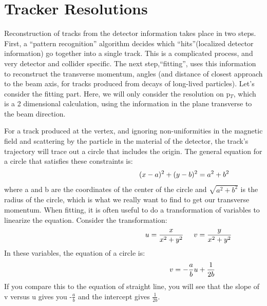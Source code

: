 \section{Tracker Resolutions}
Reconstruction of tracks from the detector information takes place in two steps. First, a ``pattern recognition'' algorithm decides which ``hits''(localized detector information) go together into a single track. This is a complicated process, and very detector and collider specific. The next step,``fitting'', uses this information to reconstruct the transverse momentum, angles (and distance of closest approach to the beam axis, for tracks produced from decays of long-lived particles).  
Let's consider the fitting part.  Here, we will only consider the resolution on p$_{T}$, which is a 2 dimensional calculation, using the information in the plane transverse to the beam direction.   

For a track produced at the vertex, and ignoring non-uniformities in the magnetic field and scattering by the particle in the material of the detector, the track's trajectory will trace out a circle that includes the origin.  The general equation for a circle that satisfies these constraints is:
\begin{equation*}\hspace{50 mm}
(x-a)^{2}+(y-b)^{2}=a^{2}+b^{2}
\end{equation*}
where a and b are the coordinates of the center of the circle and $\sqrt{a^{2}+b^{2}}$ is the radius of the circle, which is what we really want to find to get our transverse momentum.
When fitting, it is often useful to do a transformation of variables to linearize the equation.  Consider the transformation:
\begin{equation*}\hspace {54mm}
u=\frac{x}{x^{2}+y^{2}} \hspace{5 mm} v=\frac{y}{x^{2}+y^{2}}
\end{equation*}
\noindent
In these variables, the equation of a circle is:
\begin{equation*}\hspace{58 mm}
v =-\frac{a}{b}u+\frac{1}{2b}
\end{equation*}
If you compare this to the equation of straight line, you will see that the slope of v versus u gives you -$\frac{a}{b}$ and the intercept gives $\frac{1}{2b}$.

